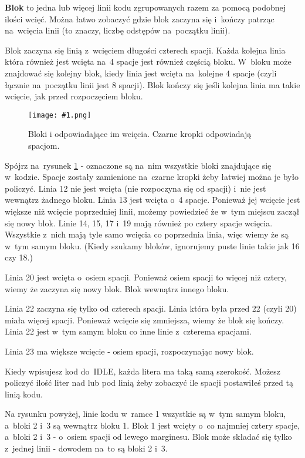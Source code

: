 \documentclass{book}
\newcommand{\img}[3]{
\begin{figure}
\centerline{
	\texttt{[image: \#1.png]}
}
\caption{#2}
\label{#1}
\end{figure}
}
\begin{document}
{\bf Blok} to jedna lub więcej linii kodu zgrupowanych razem za pomocą podobnej ilości wcięć. Można łatwo zobaczyć gdzie blok zaczyna się i~kończy patrząc na~wcięcia linii (to znaczy, liczbę odstępów na~początku linii).

Blok zaczyna się linią z~wcięciem długości czterech spacji. Każda kolejna linia która również jest wcięta na~4 spacje jest również częścią bloku. W~bloku może znajdować się kolejny blok, kiedy linia jest wcięta na~kolejne 4 spacje (czyli łącznie na~początku linii jest 8 spacji). Blok kończy się jeśli kolejna linia ma takie wcięcie, jak przed rozpoczęciem bloku.

\img{guess-blocks}{Bloki i odpowiadające im wcięcia. Czarne kropki odpowiadają spacjom.}{7cm}

Spójrz na~rysunek \ref{guess-blocks} - oznaczone są na~nim wszystkie bloki znajdujące się w~kodzie. Spacje zostały zamienione na~czarne kropki żeby łatwiej można je było policzyć. Linia 12 nie jest wcięta (nie rozpoczyna się od spacji) i~nie jest wewnątrz żadnego bloku. Linia 13 jest wcięta o~4 spacje. Ponieważ jej wcięcie jest większe niż wcięcie poprzedniej linii, możemy powiedzieć że w~tym miejscu zaczął się nowy blok. Linie 14, 15, 17 i~19 mają również po cztery spacje wcięcia. Wszystkie z~nich mają tyle samo wcięcia co poprzednia linia, więc wiemy że są w~tym samym bloku. (Kiedy szukamy bloków, ignorujemy puste linie takie jak 16 czy 18.)

Linia 20 jest wcięta o~osiem spacji. Ponieważ osiem spacji to więcej niż cztery, wiemy że zaczyna się nowy blok. Blok wewnątrz innego bloku.

Linia 22 zaczyna się tylko od czterech spacji. Linia która była przed 22 (czyli 20) miała więcej spacji. Ponieważ wcięcie się zmniejsza, wiemy że blok się kończy. Linia 22 jest w~tym samym bloku co inne linie z~czterema spacjami.

Linia 23 ma większe wcięcie - osiem spacji, rozpoczynając nowy blok.

Kiedy wpisujesz kod do~IDLE, każda litera ma taką samą szerokość. Możesz policzyć ilość liter nad lub pod linią żeby zobaczyć ile spacji postawiłeś przed tą linią kodu.

Na rysunku powyżej, linie kodu w~ramce 1 wszystkie są w~tym samym bloku, a~bloki 2 i~3 są wewnątrz bloku 1. Blok 1 jest wcięty o~co najmniej cztery spacje, a~bloki 2 i~3 - o~osiem spacji od lewego marginesu. Blok może składać się tylko z~jednej linii - dowodem na~to są bloki 2 i~3.
\end{document}
